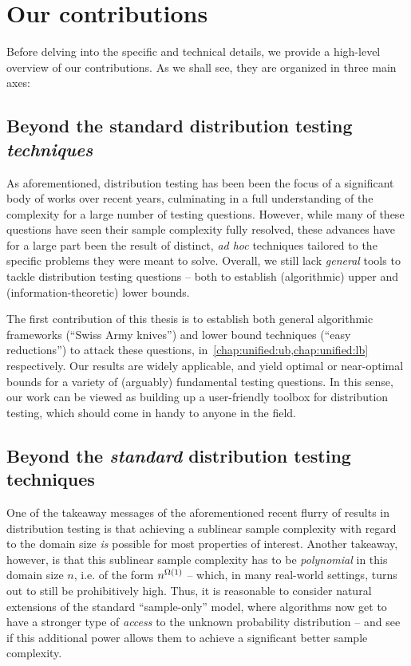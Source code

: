 \section*{Our contributions}
Before delving into the specific and technical details, we provide a high-level overview of our contributions. As we shall see, they are organized in three main axes:

\subsection*{Beyond the standard distribution testing \emph{techniques}}  As aforementioned, distribution testing has been been the focus of a significant body of works over recent years, culminating in a full understanding of the complexity for a large number of testing questions. However, while many of these questions have seen their sample complexity fully resolved, these advances have for a large part been the result of distinct, \textit{ad hoc} techniques tailored to the specific problems they were meant to solve. Overall, we still lack \emph{general} tools to tackle distribution testing questions -- both to establish (algorithmic) upper and (information-theoretic) lower bounds.

The first contribution of this thesis is to establish both general algorithmic frameworks (``Swiss Army knives'') and lower bound techniques (``easy reductions'') to attack these questions, in~\cref{chap:unified:ub,chap:unified:lb} respectively. Our results are widely applicable, and yield optimal or near-optimal bounds for a variety of (arguably) fundamental testing questions. In this sense, our work can be viewed as building up a user-friendly toolbox for distribution testing, which should come in handy to anyone in the field.

\subsection*{Beyond the \emph{standard} distribution testing techniques} One of the takeaway messages of the aforementioned recent flurry of results in distribution testing is that achieving a sublinear sample complexity with regard to the domain size \emph{is} possible for most properties of interest. Another takeaway, however, is that this sublinear sample complexity has to be \emph{polynomial} in this domain size $n$, i.e. of the form $n^{\bigOmega{1}}$ -- which, in many real-world settings, turns out to still be prohibitively high. Thus, it is reasonable to consider natural extensions of the standard ``sample-only'' model, where algorithms now get to have a stronger type of \emph{access} to the unknown probability distribution -- and see if this additional power allows them to achieve a significant better sample complexity. 

